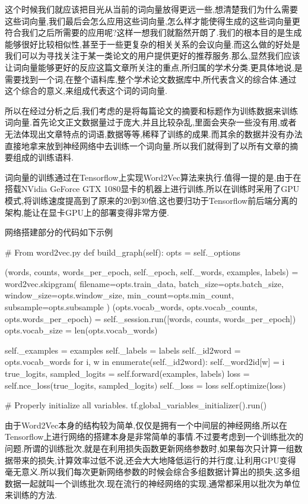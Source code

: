 这个时候我们就应该把目光从当前的词向量放得更远一些,想清楚我们为什么需要这些词向量,我们最后会怎么应用这些词向量,怎么样才能使得生成的这些词向量更符合我们之后所需要的应用呢?这样一想我们就豁然开朗了.我们的根本目的是生成能够很好比较相似性,甚至于一些更复杂的相关关系的会议向量.而这么做的好处是我们可以为寻找关注于某一类论文的用户提供更好的推荐服务.那么,显然我们应该让词向量能够更好的反应这篇文章所关注的重点,所归属的学术分类.更具体地说,是需要找到一个词,在整个语料库,整个学术论文数据库中,所代表含义的综合体.通过这个综合的意义,来组成代表这个词的词向量.

所以在经过分析之后,我们考虑的是将每篇论文的摘要和标题作为训练数据来训练词向量.首先论文正文数据量过于庞大,并且比较杂乱,里面会夹杂一些没有用,或者无法体现出文章特点的词语,数据等等,稀释了训练的成果.而其余的数据并没有办法直接地拿来放到神经网络中去训练一个词向量.所以我们就得到了以所有文章的摘要组成的训练语料.

词向量的训练通过在Tensorflow上实现Word2Vec算法来执行.值得一提的是,由于在搭载NVidia GeForce GTX 1080显卡的机器上进行训练,所以在训练时采用了GPU模式,将训练速度提高到了原来的20到30倍,这也要归功于Tensorflow前后端分离的架构,能让在显卡GPU上的部署变得非常方便.

网络搭建部分的代码如下示例

\begin{python}
# From word2vec.py
def build_graph(self):
    opts = self._options

    (words, counts, words_per_epoch, self._epoch, self._words, examples, labels) = word2vec.skipgram(
            filename=opts.train_data,
            batch_size=opts.batch_size,
            window_size=opts.window_size,
            min_count=opts.min_count,
            subsample=opts.subsample
            )
    (opts.vocab_words, opts.vocab_counts,
     opts.words_per_epoch) = self._session.run([words, counts, words_per_epoch])
    opts.vocab_size = len(opts.vocab_words)


    self._examples = examples
    self._labels = labels
    self._id2word = opts.vocab_words
    for i, w in enumerate(self._id2word):
        self._word2id[w] = i
    true_logits, sampled_logits = self.forward(examples, labels)
    loss = self.nce_loss(true_logits, sampled_logits)
    self._loss = loss
    self.optimize(loss)

    # Properly initialize all variables.
    tf.global_variables_initializer().run()
\end{python}

由于Word2Vec本身的结构较为简单,仅仅是拥有一个中间层的神经网络,所以在Tensorflow上进行网络的搭建本身是非常简单的事情.不过要考虑到一个训练批次的问题.所谓的训练批次,就是在利用损失函数更新网络参数时,如果每次只计算一组数据带来的损失,计算效率过低不说,还会大大地降低运行的并行度,让利用GPU变得毫无意义.所以我们每次更新网络参数的时候会综合多组数据计算出的损失,这多组数据一起就叫一个训练批次.现在流行的神经网络的实现,通常都采用以批次为单位来训练的方法.


